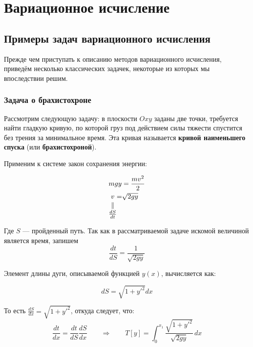 \documentclass[12pt]{article}
\begin{document}
\section{Вариационное исчисление}

	\subsection{Примеры задач вариационного исчисления}

	Прежде чем приступать к описанию методов вариационного исчисления, приведём несколько классических
	задачек, некоторые из которых мы впоследствии решим.

		\subsubsection{Задача о брахистохроне}

			Рассмотрим следующую задачу: в плоскости $Oxy$ заданы две точки, требуется найти гладкую кривую, 
			по которой груз под действием силы тяжести спустится без трения за минимальное время. Эта кривая
			называется \textbf{кривой наименьшего спуска} (или \textbf{брахистохроной}).


			Применим к системе закон сохранения энергии:

			\begin{align*}
				&mgy = \frac{mv^2}{2} \\
				&\begin{CD}
					v @.=@. \sqrt{2gy} @.\\
					\vspace{-27pt}\\
					\parallel @. @. @. \\
					\vspace{-27pt}\\
					\frac{dS}{dt} @. @. @.
				\end{CD}
			\end{align*}

			Где $S$ --- пройденный путь. Так как в рассматриваемой задаче искомой величиной является время,
			запишем $$\frac{dt}{dS} = \frac{1}{\sqrt{2gy}}$$

			Элемент длины дуги, описываемой функцией $y(x)$, вычисляется как:

			$$dS = \sqrt{1 + y'^2} dx$$

			То есть $\frac{dS}{dx} = \sqrt{1 + y'^2}$, откуда следует, что:
			$$\frac{dt}{dx} = \frac{dt}{dS} \frac{dS}{dx} \qquad\Rightarrow\qquad 
				T[y] = \int_0^{x_1} \frac{\sqrt{1+y'^2}}{\sqrt{2gy}} \, dx$$
\end{document}
